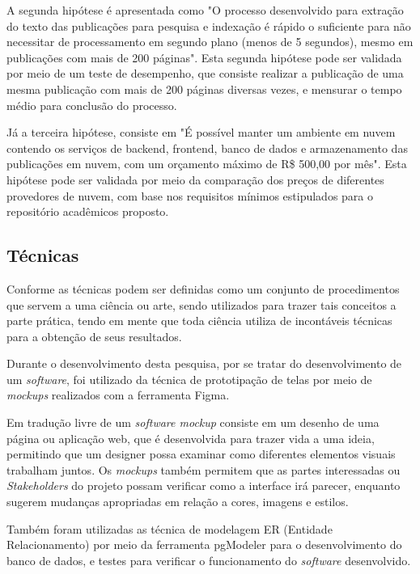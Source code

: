A segunda hipótese é apresentada como "O processo desenvolvido
para extração do texto das publicações para pesquisa e indexação
é rápido o suficiente para não necessitar de processamento em
segundo plano (menos de 5 segundos), mesmo em publicações com mais
de 200 páginas". Esta segunda hipótese pode ser validada por meio
de um teste de desempenho, que consiste realizar a publicação de uma
mesma publicação com mais de 200 páginas diversas vezes, e mensurar
o tempo médio para conclusão do processo.

Já a terceira hipótese, consiste em "É possível manter um ambiente
em nuvem contendo os serviços de backend, frontend, banco de dados
e armazenamento das publicações em nuvem, com um orçamento máximo
de R\$ 500,00 por mês". Esta hipótese pode ser validada por meio
da comparação dos preços de diferentes provedores de nuvem, com
base nos requisitos mínimos estipulados para o repositório
acadêmicos proposto.

\subsection{Técnicas}

Conforme \citep[p. 174]{LAKATOS2003:metodologia} as técnicas podem
ser definidas como um conjunto de procedimentos que servem a
uma ciência ou arte, sendo utilizados para trazer tais
conceitos a parte prática, tendo em mente que toda ciência utiliza
de incontáveis técnicas para a obtenção de seus resultados.

Durante o desenvolvimento desta pesquisa, por se tratar do
desenvolvimento de um \emph{software}, foi utilizado da técnica
de prototipação de telas por meio de \emph{mockups} realizados
com a ferramenta Figma.

Em tradução livre de \cite{uzayr:mockups} um \emph{software mockup}
consiste em um desenho de uma página ou aplicação web,
que é desenvolvida para trazer vida a uma ideia, permitindo
que um designer possa examinar como diferentes elementos visuais
trabalham juntos. Os \emph{mockups} também permitem que as partes
interessadas ou \emph{Stakeholders} do projeto possam verificar como a
interface irá parecer, enquanto sugerem mudanças
apropriadas em relação a cores, imagens e estilos.

Também foram utilizadas as técnica de modelagem ER (Entidade Relacionamento)
por meio da ferramenta pgModeler para o desenvolvimento do banco de dados,
e testes para verificar o funcionamento do \emph{software} desenvolvido.


